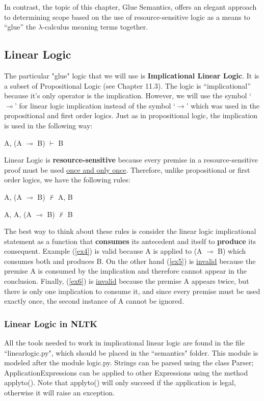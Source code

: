 \documentclass{article}
\begin{document}
In contrast, the topic of this chapter, Glue Semantics, offers an elegant
approach to determining scope based on the use of resource-sensitive logic as a
means to ``glue'' the $\lambda$-calculus meaning terms together.

\subsection{Linear Logic}
The particular "glue" logic that we will use is \textbf{Implicational Linear
Logic}. It is a subset of Propositional Logic (see Chapter 11.3). The logic is
``implicational'' because it's only operator is the implication. However, we will
use the symbol `$\multimap$' for linear logic implication instead of the symbol
`$\rightarrow$' which was used in the propositional and first order logics. Just as
in propositional logic, the implication is used in the following way:

\begin{examples}
	\item\label{ex4} A, (A $\multimap$ B) $\vdash$ B
\end{examples}

Linear Logic is \textbf{resource-sensitive} because every premise in a
resource-sensitive proof must be used \underline{once and only once}. Therefore,
unlike propositional or first order logics, we have the following rules:
	
\begin{examples}
	\item\label{ex5} A, (A $\multimap$ B) $\nvdash$ A, B
	\item\label{ex6} A, A, (A $\multimap$ B) $\nvdash$ B
\end{examples}

The best way to think about these rules is consider the linear logic
implicational statement as a function that \textbf{consumes} its antecedent and
itself to \textbf{produce} its consequent.  Example (\ref{ex4}) is valid because A
is applied to (A $\multimap$ B) which consumes both and produces B.  On the
other hand (\ref{ex5}) is \underline{invalid} because the premise A is consumed
by the implication and therefore cannot appear in the conclusion.  Finally,
(\ref{ex6}) is \underline{invalid} because the premise A appears twice, but
there is only one implication to consume it, and since every premise must be
used exactly once, the second instance of A cannot be ignored.

\subsubsection{Linear Logic in NLTK}
All the tools needed to work in implicational linear logic are found in the file
``linearlogic.py", which should be placed in the ``semantics" folder.  This
module is modeled after the module logic.py.  Strings can be parsed using the
class Parser; ApplicationExpressions can be applied to other Expressions
using the method applyto().  Note that applyto() will only succeed if the
application is legal, otherwise it will raise an exception.
\end{document}
